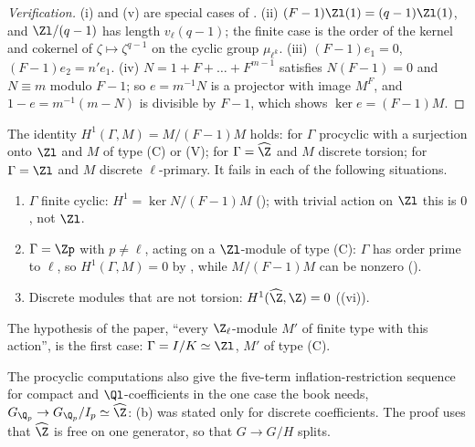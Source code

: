 \begin{proof}[Verification]
(i) and (v) are special cases of . (ii) $(F-1)\Zl(1)=(q-1)\Zl(1)$, and $\Zl/(q-1)$ has length $v_\ell(q-1)$; the finite case is the
order of the kernel and cokernel of $\zeta\mapsto\zeta^{q-1}$ on the cyclic group $\mu_{\ell^k}$. (iii) $(F-1)e_1=0$, $(F-1)e_2=n'e_1$. (iv) $N=1+F+\dots+F^{m-1}$
satisfies $N(F-1)=0$ and $N\equiv m$ modulo $F-1$; so $e=m^{-1}N$ is a projector with image $M^F$, and $1-e=m^{-1}(m-N)$ is divisible by $F-1$, which shows $\ker e=(F-1)M$.
\end{proof}

\begin{warning}\label{warn:cohomology:procyclic}
The identity $H^1(\Gamma,M)=M/(F-1)M$ holds: for $\Gamma$ procyclic with a surjection onto $\Zl$ and $M$ of type (C) or (V); for $\Gamma=\widehat\Z$ and $M$ discrete torsion;
for $\Gamma=\Zl$ and $M$ discrete $\ell$-primary. It fails in each of the following situations.
\begin{enumerate}[label=(\roman*)]
\item $\Gamma$ finite cyclic: $H^1=\ker N/(F-1)M$ (); with trivial action on $\Zl$ this is $0$, not $\Zl$.
\item $\Gamma=\Zp$ with $p\ne\ell$, acting on a $\Zl$-module of type (C): $\Gamma$ has order prime to $\ell$, so $H^1(\Gamma,M)=0$ by , while
$M/(F-1)M$ can be nonzero ().
\item Discrete modules that are not torsion: $H^1(\widehat\Z,\Z)=0$ ((vi)).
\end{enumerate}
The hypothesis of the paper, ``every $\Z_\ell$-module $M'$ of finite type with this action'', is the first case: $\Gamma=I/K\simeq\Zl$, $M'$ of type (C).
\end{warning}

The procyclic computations also give the five-term inflation-restriction sequence for compact and $\Ql$-coefficients in the one case the book needs,
$G_{\Q_p}\to G_{\Q_p}/I_p\simeq\widehat\Z$: (b) was stated only for discrete coefficients. The proof uses that $\widehat\Z$ is free on one
generator, so that $G\to G/H$ splits.

